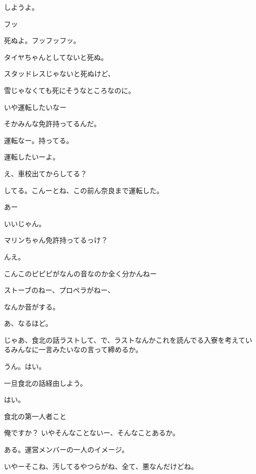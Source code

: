 \begin{multicols}{3}
{        しようよ。

        フッ

        死ぬよ。フッフッフッ。

        タイヤちゃんとしてないと死ぬ。

        スタッドレスじゃないと死ぬけど、

        雪じゃなくても死にそうなところなのに。

        いや運転したいなー

        そかみんな免許持ってるんだ。

        運転なー。持ってる。

        運転したいーよ。

        え、車校出てからしてる？

        してる。こんーとね、この前ん奈良まで運転した。

        あー

        いいじゃん。

        マリンちゃん免許持ってるっけ？

        んえ。

        こんこのピピピがなんの音なのか全く分かんねー

        ストーブのねー、プロペラがねー、

        なんか音がする。

        あ、なるほど。

        じゃあ、食北の話ラストして、で、ラストなんかこれを読んでる入寮を考えているみんなに一言みたいなの言って締めるか。

        うん。はい。

        一旦食北の話経由しよう。

        はい。

        食北の第一人者こと

        俺ですか？ いやそんなことないー、そんなことあるか。

        ある。運営メンバーの一人のイメージ。

        いやーそこね、汚してるやつらがね、全て、悪なんだけどね。

}
\end{multicols}
